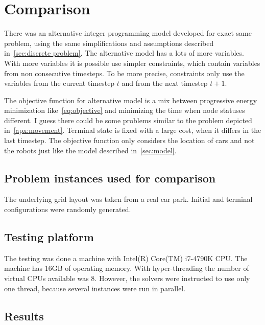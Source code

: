 \section{Comparison}
There was an alternative integer programming model developed for exact same
problem, using the same simplifications and assumptions described
in~\autoref{sec:discrete problem}. The alternative model has a lots of more
variables. With more variables it is possible use simpler constraints, which
contain variables from non consecutive timesteps. To be more precise,
constraints only use the variables from the current timestep $t$ and from the
next timestep $t+1$.

The objective function for alternative model is a mix between progressive
energy minimization like~\eqref{eq:objective} and minimizing the time when node
statuses different. I guess there could be some problems similar to the problem
depicted in~\autoref{apx:movement}. Terminal state is fixed with a large cost,
when it differs in the last timestep. The objective function only considers the
location of cars and not the robots just like the model described
in~\autoref{sec:model}.

\subsection{Problem instances used for comparison}
The underlying grid layout was taken from a real car park. Initial and terminal
configurations were randomly generated.

\subsection{Testing platform}
The testing was done a machine with Intel(R) Core(TM) i7-4790K CPU.  The
machine has 16GB of operating memory. With hyper-threading the number of
virtual CPUs available was 8. However, the solvers were instructed to use only
one thread, because several instances were run in parallel.

\subsection{Results}

